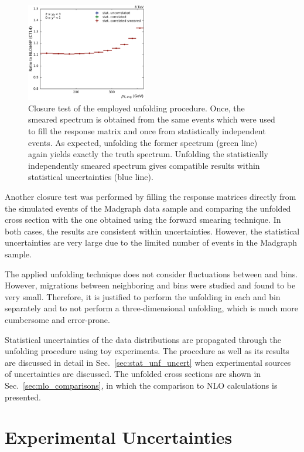 \begin{figure}[htp]
    \includegraphics[width=0.47\textwidth]{figures/measurement/unf_nlo_check_yb2ys0.pdf}
    \caption[Closure check of unfolding technique]{Closure test of the employed unfolding
    procedure. Once, the smeared spectrum is obtained from the same events which
were used to fill the response matrix and once from statistically independent
events. As expected, unfolding the former spectrum (green line) again yields exactly the
truth spectrum. Unfolding the statistically independently smeared spectrum
gives compatible results within statistical uncertainties (blue line).}
    \label{fig:unf_closure_test}
\end{figure}

Another closure test was performed by filling the response matrices directly
from the simulated events of the Madgraph data sample and comparing the unfolded
cross section with the one obtained using the forward smearing technique. In
both cases, the results are consistent within uncertainties. However, the
statistical uncertainties are very large due to the limited number of events in
the Madgraph sample.

The applied unfolding technique does not consider fluctuations between
\ystar and \yboost bins. However, migrations between neighboring \ystar and
\yboost bins were studied and found to be very small. Therefore, it is justified
to perform the unfolding in each \ystar and \yboost bin separately and to not
perform a three-dimensional unfolding, which is much more cumbersome and
error-prone.

Statistical uncertainties of the data distributions are propagated through the
unfolding procedure using toy experiments. The procedure as well as its results
are discussed in detail in Sec.~\ref{sec:stat_unf_uncert} when experimental
sources of uncertainties are discussed. The unfolded cross sections are shown in
Sec.~\ref{sec:nlo_comparisons}, in which the comparison to NLO calculations is
presented.

\section{Experimental Uncertainties}
\label{sec:experimental_uncertainties}

